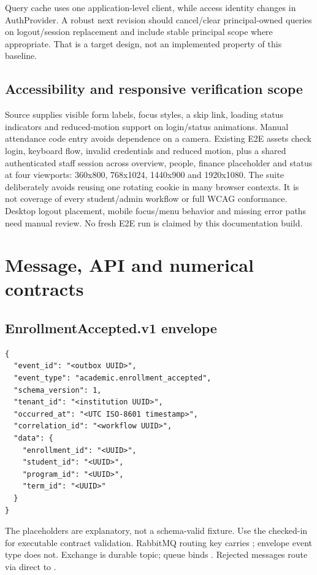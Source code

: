 \documentclass[10pt,a4paper]{article}
\begin{document}
Query cache uses one application-level client, while access identity changes in
AuthProvider. A robust next revision should cancel/clear principal-owned queries
on logout/session replacement and include stable principal scope where appropriate.
That is a target design, not an implemented property of this baseline.

\subsection{Accessibility and responsive verification scope}
Source supplies visible form labels, focus styles, a skip link, loading status
indicators and reduced-motion support on login/status animations. Manual attendance
code entry avoids dependence on a camera. Existing E2E assets check login, keyboard
flow, invalid credentials and reduced motion, plus a shared authenticated staff
session across overview, people, finance placeholder and status at four viewports:
360x800, 768x1024, 1440x900 and 1920x1080.
The suite deliberately avoids reusing one rotating cookie in many browser contexts.
It is not coverage of every student/admin workflow or full WCAG conformance.
Desktop logout placement, mobile focus/menu behavior and missing error paths need
manual review. No fresh E2E run is claimed by this documentation build.

\clearpage
\section{Message, API and numerical contracts}\label{app:contracts}
\subsection{EnrollmentAccepted.v1 envelope}
\begin{lstlisting}
{
  "event_id": "<outbox UUID>",
  "event_type": "academic.enrollment_accepted",
  "schema_version": 1,
  "tenant_id": "<institution UUID>",
  "occurred_at": "<UTC ISO-8601 timestamp>",
  "correlation_id": "<workflow UUID>",
  "data": {
    "enrollment_id": "<UUID>",
    "student_id": "<UUID>",
    "program_id": "<UUID>",
    "term_id": "<UUID>"
  }
}
\end{lstlisting}
The placeholders are explanatory, not a schema-valid fixture. Use the checked-in
 for executable
contract validation. RabbitMQ routing key carries ; envelope event type
does not. Exchange  is durable topic; queue
 binds .
Rejected messages route via direct  to
.
\end{document}
